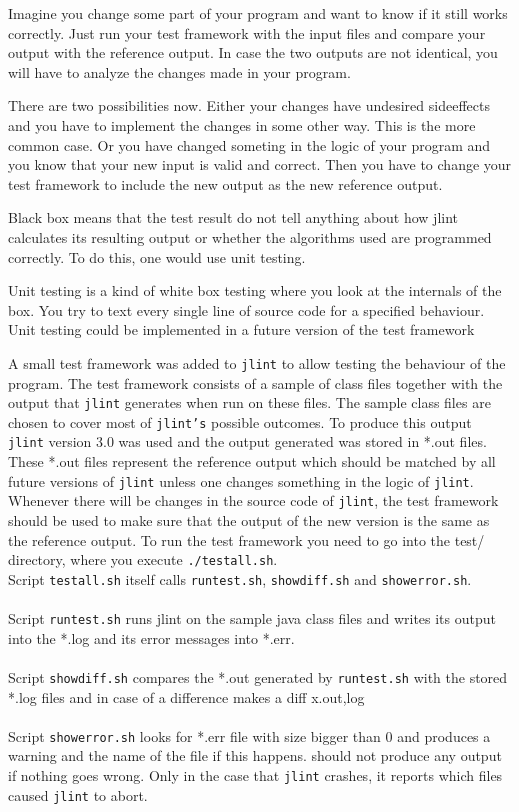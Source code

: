 \documentclass[11pt,twoside,a4paper,draft]{article}
\begin{document}
Imagine you change some part of your program and want to know if it 
still works correctly. Just run your test framework with the input files
and compare your output with the reference output. In case the two
outputs are not identical, you will have to analyze the changes 
made in your program.

There are two possibilities now. Either your changes have undesired
sideeffects and you have to implement the changes in some other 
way. This is the more common case. Or you have changed someting
in the logic of your program and you know that your new input is
valid and correct. Then you have to change your test framework
to include the new output as the new reference output.


Black box means that the test result do not tell anything about how
jlint calculates its resulting output or whether the algorithms used
are programmed correctly. To do this, one would use unit testing.

Unit testing is a kind of white box testing where you look at the internals
of the box. You try to text every single line of source code for a
specified behaviour. Unit testing could be implemented in a future version
of the test framework 


A small test framework was added to \texttt{jlint} to allow testing the
behaviour of the program. The test framework consists of a sample of class
files together with the output that \texttt{jlint} generates when run on these
files. The sample class files are chosen to cover most of \texttt{jlint's}
possible outcomes. To produce this output \texttt{jlint} version 3.0 was used
and the output generated was stored in *.out files. These *.out files 
represent the reference output which should be matched by all future versions
of \texttt{jlint} unless one changes something in the logic of \texttt{jlint}.
Whenever there will be changes in the source code of \texttt{jlint}, the test
framework should be used to make sure that the output of the new version is 
the same as the reference output. To run the test framework you need to go
into the test/ directory, where you execute \texttt{./testall.sh}.
\\Script \texttt{testall.sh} itself calls \texttt{runtest.sh}, 
\texttt{show\-diff.sh} and \texttt{showerror.sh}.
\\\\Script \texttt{runtest.sh}
runs jlint on the sample java class files and writes its output into the 
*.log and its error messages into *.err.
\\\\Script \texttt{showdiff.sh}
compares the *.out generated by \texttt{runtest.sh} with the stored *.log
files and in case of a difference makes a diff x.{out,log}
\\\\Script \texttt{showerror.sh}
looks for *.err file with size bigger than 0 and produces a warning and the 
name of the file if this happens.
should not produce any output if nothing goes wrong. Only in the case that 
\texttt{jlint} crashes, it reports which files caused \texttt{jlint} to abort.
\end{document}

